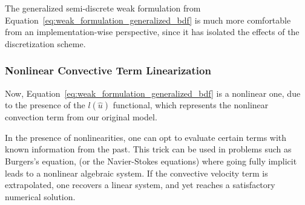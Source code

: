 \documentclass[../../thesis.tex]{subfiles}
\begin{document}
The generalized semi-discrete weak formulation from 
Equation~\eqref{eq:weak_formulation_generalized_bdf} 
is much more comfortable from an implementation-wise perspective,
since it has isolated the effects of the discretization scheme.

\subsubsection{Nonlinear Convective Term Linearization}
Now, Equation~\eqref{eq:weak_formulation_generalized_bdf}
is a nonlinear one, due to the presence of the $l(\hat{u})$ functional,
which represents the nonlinear convection term from our original model.

In the presence of nonlinearities, one can opt to evaluate certain terms 
with known information from the past.
This trick can be used in problems such as Burgers's equation, 
(or the Navier-Stokes equations)
where going fully implicit leads to a nonlinear algebraic system. 
If the convective velocity term is extrapolated, 
one recovers a linear system, and yet reaches a satisfactory numerical solution.


\end{document}

